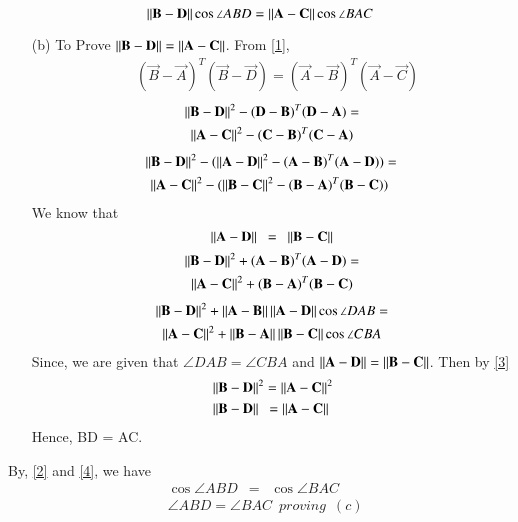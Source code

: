 \documentclass[journal,12pt,twocolumn]{IEEEtran}
\begin{document}
\begin{equation}\label{2}
 \left\lVert\mathbf{B} - \mathbf{D}\right\rVert\cos\angle ABD  = \left\lVert\mathbf{A} - \mathbf{C}\right\rVert\cos\angle BAC
\end{equation}
\begin{enumerate}
\item[(b)] To Prove $\left\lVert\mathbf{B} - \mathbf{D}\right\rVert = \left\lVert\mathbf{A} - \mathbf{C}\right\rVert$. From \eqref{1},
\begin{align}
	& (\vec B -\vec A)^T(\vec{B}-\vec{D}) = (\vec A -\vec B)^T(\vec{A}-\vec{C})
\end{align}
\begin{multline}
\left\lVert\mathbf{B}-\mathbf{D}\right\rVert^2 - (\mathbf D -\mathbf B)^T(\mathbf{D}-\mathbf{A})= \\ \left\lVert\mathbf{A}-\mathbf{C}\right\rVert^2 - (\mathbf C -\mathbf B)^T(\mathbf{C}-\mathbf{A})	
\end{multline}
\begin{multline}
 \norm{\vec{B}-\vec{D}}^2 - (\norm{\vec{A}-\vec{D}}^2 - (\vec A -\vec B)^T(\vec A -\vec D))   = \\
 \norm{\vec{A}-\vec{C}}^2 - (\norm{\vec{B}-\vec{C}}^2 - (\vec B -\vec A)^T(\vec B -\vec C))\	
\end{multline}
We know that
\begin{equation}
	\left\lVert\mathbf{A}-\mathbf{D}\right\rVert\enspace = \enspace \left\lVert\mathbf{B}-\mathbf{C}\right\rVert 
\end{equation}
\begin{multline}
\left\lVert\mathbf{B}-\mathbf{D}\right\rVert^2 + (\mathbf A -\mathbf B)^T(\mathbf{A}-\mathbf{D}) = \\ \left\lVert\mathbf{A}-\mathbf{C}\right\rVert^2 + (\mathbf B -\mathbf A)^T(\mathbf{B}-\mathbf{C}) 	
\end{multline}
\begin{multline}
\left\lVert\mathbf{B}-\mathbf{D}\right\rVert^2 + \left\lVert\mathbf{A}-\mathbf{B}\right\rVert\left\lVert\mathbf{A}-\mathbf{D}\right\rVert\cos \angle DAB = \\
 \left\lVert\mathbf{A}-\mathbf{C}\right\rVert^2 + \left\lVert\mathbf{B}-\mathbf{A}\right\rVert\left\lVert\mathbf{B}-\mathbf{C}\right\rVert\cos \angle CBA \label{3}	
\end{multline}
Since, we are given that $\angle DAB = \angle CBA$ and $\left\lVert\mathbf{A}-\mathbf{D}\right\rVert = \left\lVert\mathbf{B}-\mathbf{C}\right\rVert$. Then by \eqref{3}
\begin{align}
	& \left\lVert\mathbf{B}-\mathbf{D}\right\rVert^2 = \left\lVert\mathbf{A}-\mathbf{C}\right\rVert^2 \\
	& \label{4}\left\lVert\mathbf{B}-\mathbf{D}\right\rVert \enspace = \left\lVert\mathbf{A}-\mathbf{C}\right\rVert
\end{align}
Hence, BD = AC.
\end{enumerate}
By, \eqref{2} and \eqref{4}, we have
\begin{align}
	& \cos\angle ABD \enspace = \enspace \cos\angle BAC \\
	& \angle ABD = \angle BAC \enspace proving \enspace (c)
\end{align}
\end{document}
